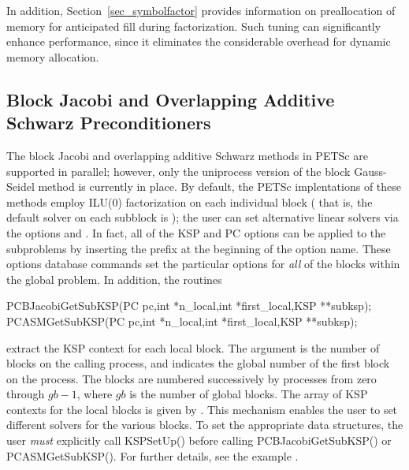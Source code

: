 In addition, Section~\ref{sec_symbolfactor} provides information on
preallocation of memory for anticipated fill during factorization.  
Such tuning can significantly enhance performance, since it
eliminates the considerable overhead for dynamic memory allocation.

\subsection{Block Jacobi and 
            Overlapping Additive Schwarz Preconditioners}
\label{sec_bjacobi}

 
  
The block Jacobi and overlapping additive Schwarz methods in PETSc are
supported in parallel; however, only the uniprocess
version of the block Gauss-Seidel method is currently in place.
By default, the PETSc implentations of these methods
employ ILU(0) factorization on each individual block ( that is, the default solver on each 
subblock is ); the user can set alternative linear solvers via the options 
 
 and . In fact, all of the KSP
and PC options can be applied to the subproblems by inserting the prefix
 at the beginning of the option name. 
These options database commands set the particular options for {\em all} 
of the blocks within the global problem.  In addition, the routines
\begin{tabbing}
  PCBJacobiGetSubKSP(PC pc,int *n\_local,int *first\_local,KSP **subksp);\\
  PCASMGetSubKSP(PC pc,int *n\_local,int *first\_local,KSP **subksp);
\end{tabbing}
extract the  KSP context for each local 
block.  The argument  is the number of blocks on the 
calling process, and  indicates the global number 
of the first block on the process. The blocks are numbered 
successively by processes from zero through $ gb-1$, 
where $ gb $ is the number of global blocks.  
The array of KSP contexts for the local blocks is given by . 
This mechanism enables the user to set different solvers for the 
various blocks.  To set the appropriate data structures, the 
user {\em must} explicitly call KSPSetUp()  
before calling PCBJacobiGetSubKSP() or
PCASMGetSubKSP().
For further details, see the 
example .

